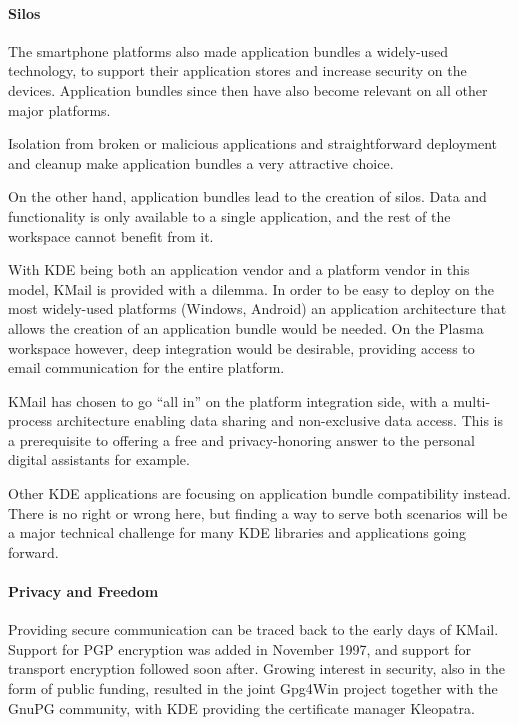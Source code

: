 \paragraph{Silos}

The smartphone platforms also made application bundles a widely-used technology, to support their application stores and increase security on the devices. Application bundles since then have also become relevant on all other major platforms.

Isolation from broken or malicious applications and straightforward deployment and cleanup make application bundles a very attractive choice.

On the other hand, application bundles lead to the creation of silos. Data and functionality is only available to a single application, and the rest of the workspace cannot benefit from it.

With KDE being both an application vendor and a platform vendor in this model, KMail is provided with a dilemma. In order to be easy to deploy on the most widely-used platforms (Windows, Android) an application architecture that allows the creation of an application bundle would be needed. On the Plasma workspace however, deep integration would be desirable, providing access to email communication for the entire platform.

KMail has chosen to go “all in” on the platform integration side, with a multi-process architecture enabling data sharing and non-exclusive data access. This is a prerequisite to offering a free and privacy-honoring answer to the personal digital assistants for example.

Other KDE applications are focusing on application bundle compatibility instead. There is no right or wrong here, but finding a way to serve both scenarios will be a major technical challenge for many KDE libraries and applications going forward.

\paragraph{Privacy and Freedom}

Providing secure communication can be traced back to the early days of KMail. Support for PGP encryption was added in November 1997, and support for transport encryption followed soon after. Growing interest in security, also in the form of public funding, resulted in the joint Gpg4Win project together with the GnuPG community, with KDE providing the certificate manager Kleopatra.

